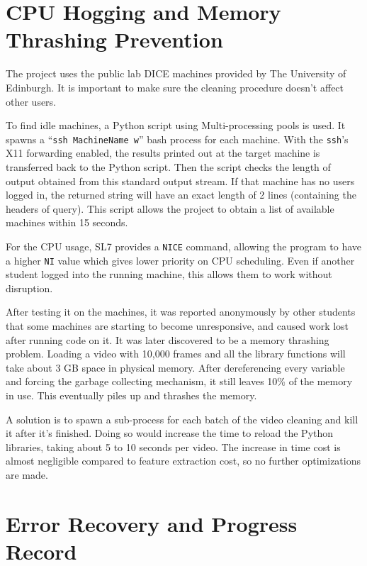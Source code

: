 \documentclass[bsc,frontabs,twoside,fullspacing,parskip,deptreport]{infthesis}
\begin{document}
\section{CPU Hogging and Memory Thrashing Prevention}

The project uses the public lab DICE machines provided by The University of Edinburgh. 
It is important to make sure the cleaning procedure doesn't affect other users.

To find idle machines, a Python script using Multi-processing pools is used. 
It spawns a ``{\tt ssh MachineName w}'' bash process for each machine.
With the {\tt ssh}'s X11 forwarding enabled, the results printed out at the target machine is transferred back to the Python script. 
Then the script checks the length of output obtained from this standard output stream. 
If that machine has no users logged in, the returned string will have an exact length of 2 lines (containing the headers of query). 
This script allows the project to obtain a list of available machines within 15 seconds.

For the CPU usage, SL7 provides a {\tt NICE} command, allowing the program to have a higher {\tt NI} value which gives lower priority on CPU scheduling. Even if another student logged into the running machine, this allows them to work without disruption.

After testing it on the machines, it was reported anonymously by other students that some machines are starting to become unresponsive, and caused work lost after running code on it. It was later discovered to be a memory thrashing problem.
Loading a video with 10,000 frames and all the library functions will take about 3 GB space in physical memory. 
After dereferencing every variable and forcing the garbage collecting mechanism, it still leaves 10\% of the memory in use. This eventually piles up and thrashes the memory. 

A solution is to spawn a sub-process for each batch of the video cleaning and kill it after it's finished. 
Doing so would increase the time to reload the Python libraries, taking about 5 to 10 seconds per video. 
The increase in time cost is almost negligible compared to feature extraction cost, so no further optimizations are made. 


\section{Error Recovery and Progress Record}
\end{document}
